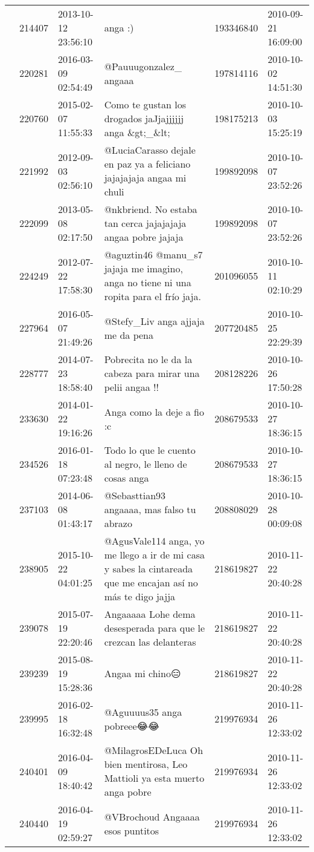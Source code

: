 \begin{tabular}{llllrl}
 & 214407& 2013-10-12 23:56:10 &anga :) & 193346840 & 2010-09-21 16:09:00 \\
 & 220281& 2016-03-09 02:54:49 & @Pauuugonzalez\_ angaaa & 197814116 & 2010-10-02 14:51:30 \\
 & 220760& 2015-02-07 11:55:33 & Como te gustan los drogados jaJjajjjjjj anga \&gt;\_\&lt; & 198175213 & 2010-10-03 15:25:19 \\
 & 221992& 2012-09-03 02:56:10 & @LuciaCarasso dejale en paz ya a feliciano jajajajaja angaa mi chuli & 199892098 & 2010-10-07 23:52:26 \\
 & 222099& 2013-05-08 02:17:50 & @nkbriend. No estaba tan cerca jajajajaja angaa pobre jajaja & 199892098 & 2010-10-07 23:52:26 \\
 & 224249& 2012-07-22 17:58:30 &@aguztin46 @manu\_s7 jajaja me imagino, anga no tiene ni una ropita para el frío jaja. & 201096055 & 2010-10-11 02:10:29 \\
 & 227964& 2016-05-07 21:49:26 &@Stefy\_Liv anga ajjaja me da pena & 207720485 & 2010-10-25 22:29:39 \\
 & 228777& 2014-07-23 18:58:40 & Pobrecita no le da la cabeza para mirar una pelii angaa !! & 208128226 & 2010-10-26 17:50:28 \\
 & 233630& 2014-01-22 19:16:26 & Anga como la deje a fio :c & 208679533 & 2010-10-27 18:36:15 \\
 & 234526& 2016-01-18 07:23:48 & Todo lo que le cuento al negro, le lleno de cosas anga & 208679533 & 2010-10-27 18:36:15 \\
 & 237103& 2014-06-08 01:43:17 & @Sebasttian93 angaaaa, mas falso tu abrazo & 208808029 & 2010-10-28 00:09:08 \\
 & 238905& 2015-10-22 04:01:25 & @AgusVale114 anga, yo me llego a ir de mi casa y sabes la cintareada que me encajan así no más te digo jajja & 218619827 & 2010-11-22 20:40:28 \\
 & 239078& 2015-07-19 22:20:46 &Angaaaaa Lohe dema desesperada para que le crezcan las delanteras & 218619827 & 2010-11-22 20:40:28 \\
 & 239239& 2015-08-19 15:28:36 &Angaa mi chino😑 & 218619827 & 2010-11-22 20:40:28 \\
 & 239995& 2016-02-18 16:32:48 &@Aguuuus35 anga pobreee😂😂 & 219976934 & 2010-11-26 12:33:02 \\
 & 240401& 2016-04-09 18:40:42 & @MilagrosEDeLuca Oh bien mentirosa, Leo Mattioli ya esta muerto anga pobre & 219976934 & 2010-11-26 12:33:02 \\
 & 240440& 2016-04-19 02:59:27 & @VBrochoud Angaaaa esos puntitos & 219976934 & 2010-11-26 12:33:02 \\

\end{tabular}
